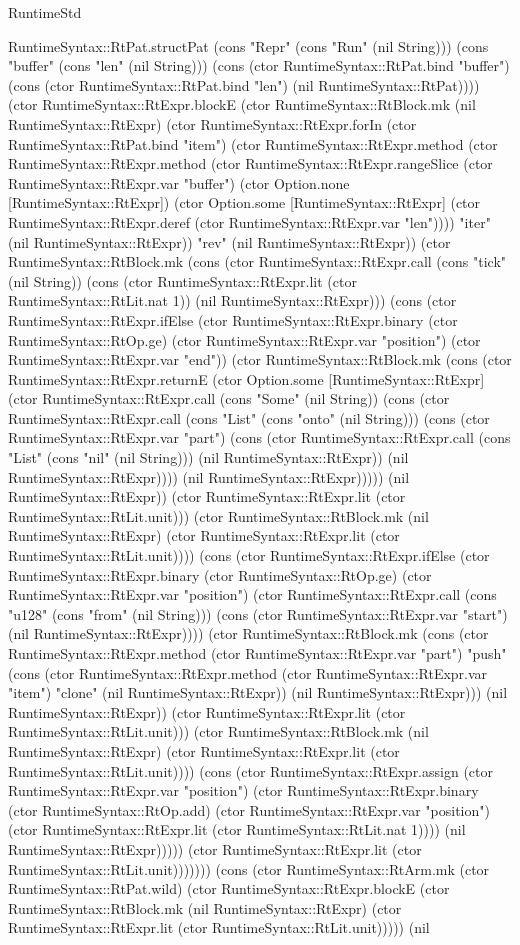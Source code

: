 \begin{lexlean}{RuntimeStd}
\begin{semanticmodule}
{RuntimeSyntax::RtPat.structPat (cons "Repr" (cons "Run" (nil String))) (cons "buffer" (cons "len" (nil String))) (cons (ctor RuntimeSyntax::RtPat.bind "buffer") (cons (ctor RuntimeSyntax::RtPat.bind "len") (nil RuntimeSyntax::RtPat)))) (ctor RuntimeSyntax::RtExpr.blockE (ctor RuntimeSyntax::RtBlock.mk (nil RuntimeSyntax::RtExpr) (ctor RuntimeSyntax::RtExpr.forIn (ctor RuntimeSyntax::RtPat.bind "item") (ctor RuntimeSyntax::RtExpr.method (ctor RuntimeSyntax::RtExpr.method (ctor RuntimeSyntax::RtExpr.rangeSlice (ctor RuntimeSyntax::RtExpr.var "buffer") (ctor Option.none [RuntimeSyntax::RtExpr]) (ctor Option.some [RuntimeSyntax::RtExpr] (ctor RuntimeSyntax::RtExpr.deref (ctor RuntimeSyntax::RtExpr.var "len")))) "iter" (nil RuntimeSyntax::RtExpr)) "rev" (nil RuntimeSyntax::RtExpr)) (ctor RuntimeSyntax::RtBlock.mk (cons (ctor RuntimeSyntax::RtExpr.call (cons "tick" (nil String)) (cons (ctor RuntimeSyntax::RtExpr.lit (ctor RuntimeSyntax::RtLit.nat 1)) (nil RuntimeSyntax::RtExpr))) (cons (ctor RuntimeSyntax::RtExpr.ifElse (ctor RuntimeSyntax::RtExpr.binary (ctor RuntimeSyntax::RtOp.ge) (ctor RuntimeSyntax::RtExpr.var "position") (ctor RuntimeSyntax::RtExpr.var "end")) (ctor RuntimeSyntax::RtBlock.mk (cons (ctor RuntimeSyntax::RtExpr.returnE (ctor Option.some [RuntimeSyntax::RtExpr] (ctor RuntimeSyntax::RtExpr.call (cons "Some" (nil String)) (cons (ctor RuntimeSyntax::RtExpr.call (cons "List" (cons "onto" (nil String))) (cons (ctor RuntimeSyntax::RtExpr.var "part") (cons (ctor RuntimeSyntax::RtExpr.call (cons "List" (cons "nil" (nil String))) (nil RuntimeSyntax::RtExpr)) (nil RuntimeSyntax::RtExpr)))) (nil RuntimeSyntax::RtExpr))))) (nil RuntimeSyntax::RtExpr)) (ctor RuntimeSyntax::RtExpr.lit (ctor RuntimeSyntax::RtLit.unit))) (ctor RuntimeSyntax::RtBlock.mk (nil RuntimeSyntax::RtExpr) (ctor RuntimeSyntax::RtExpr.lit (ctor RuntimeSyntax::RtLit.unit)))) (cons (ctor RuntimeSyntax::RtExpr.ifElse (ctor RuntimeSyntax::RtExpr.binary (ctor RuntimeSyntax::RtOp.ge) (ctor RuntimeSyntax::RtExpr.var "position") (ctor RuntimeSyntax::RtExpr.call (cons "u128" (cons "from" (nil String))) (cons (ctor RuntimeSyntax::RtExpr.var "start") (nil RuntimeSyntax::RtExpr)))) (ctor RuntimeSyntax::RtBlock.mk (cons (ctor RuntimeSyntax::RtExpr.method (ctor RuntimeSyntax::RtExpr.var "part") "push" (cons (ctor RuntimeSyntax::RtExpr.method (ctor RuntimeSyntax::RtExpr.var "item") "clone" (nil RuntimeSyntax::RtExpr)) (nil RuntimeSyntax::RtExpr))) (nil RuntimeSyntax::RtExpr)) (ctor RuntimeSyntax::RtExpr.lit (ctor RuntimeSyntax::RtLit.unit))) (ctor RuntimeSyntax::RtBlock.mk (nil RuntimeSyntax::RtExpr) (ctor RuntimeSyntax::RtExpr.lit (ctor RuntimeSyntax::RtLit.unit)))) (cons (ctor RuntimeSyntax::RtExpr.assign (ctor RuntimeSyntax::RtExpr.var "position") (ctor RuntimeSyntax::RtExpr.binary (ctor RuntimeSyntax::RtOp.add) (ctor RuntimeSyntax::RtExpr.var "position") (ctor RuntimeSyntax::RtExpr.lit (ctor RuntimeSyntax::RtLit.nat 1)))) (nil RuntimeSyntax::RtExpr))))) (ctor RuntimeSyntax::RtExpr.lit (ctor RuntimeSyntax::RtLit.unit))))))) (cons (ctor RuntimeSyntax::RtArm.mk (ctor RuntimeSyntax::RtPat.wild) (ctor RuntimeSyntax::RtExpr.blockE (ctor RuntimeSyntax::RtBlock.mk (nil RuntimeSyntax::RtExpr) (ctor RuntimeSyntax::RtExpr.lit (ctor RuntimeSyntax::RtLit.unit))))) (nil }
\end{semanticmodule}
\end{lexlean}
